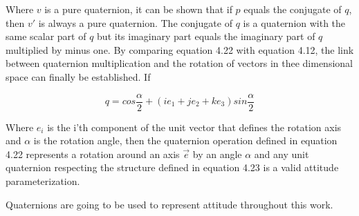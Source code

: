 \indent
	Where $v$ is a pure quaternion, it can be shown that if $p$ equals the conjugate of $q$, then $v'$ is always a pure quaternion. The conjugate of $q$ is a quaternion with the same scalar part of $q$ but its imaginary part equals the imaginary part of $q$ multiplied by minus one. By comparing equation 4.22 with equation 4.12, the link between quaternion multiplication and the rotation of vectors in thee dimensional space can finally be established. If

\begin{equation}
	q = cos\frac{\alpha}{2} + (ie_1 + je_2 + ke_3)sin\frac{\alpha}{2} 
\end{equation}

\indent
	Where $e_i$ is the i'th component of the unit vector that defines the rotation axis and $\alpha$ is the rotation angle, then the quaternion operation defined in equation 4.22 represents a rotation around an axis $\vec{e}$ by an angle $\alpha$ and any unit quaternion respecting the structure defined in equation 4.23 is a valid attitude parameterization.

\indent
	Quaternions are going to be used to represent attitude throughout this work.